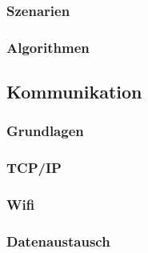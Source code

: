 \subsubsection{Szenarien}
\subsubsection{Algorithmen}

\subsection{Kommunikation} %

\subsubsection{Grundlagen}
\subsubsection{TCP/IP}
\subsubsection{Wifi}
\subsubsection{Datenaustausch} %